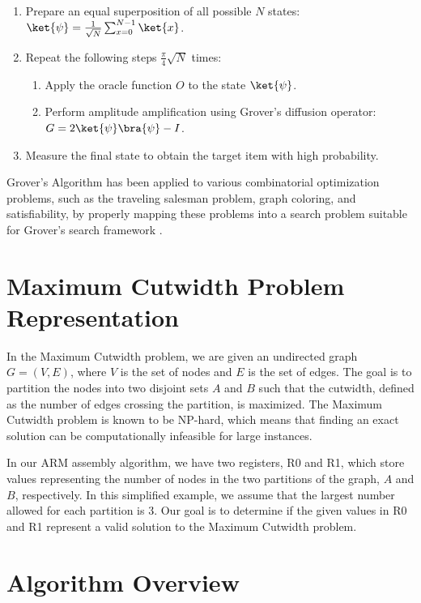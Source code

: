 \begin{enumerate}
    \item Prepare an equal superposition of all possible $N$ states: $\ket{\psi} = \frac{1}{\sqrt{N}}\sum_{x=0}^{N-1}\ket{x}$.
    
    \item Repeat the following steps $\frac{\pi}{4}\sqrt{N}$ times:
    \begin{enumerate}
        \item Apply the oracle function $O$ to the state $\ket{\psi}$.
        
        \item Perform amplitude amplification using Grover's diffusion operator: $G = 2\ket{\psi}\bra{\psi} - I$.
    \end{enumerate}
    
    \item Measure the final state to obtain the target item with high probability.
\end{enumerate}

Grover's Algorithm has been applied to various combinatorial optimization problems, such as the traveling salesman problem, graph coloring, and satisfiability, by properly mapping these problems into a search problem suitable for Grover's search framework \cite{grover_applications}.

\section{Maximum Cutwidth Problem Representation}

In the Maximum Cutwidth problem, we are given an undirected graph $G = (V, E)$, where $V$ is the set of nodes and $E$ is the set of edges. The goal is to partition the nodes into two disjoint sets $A$ and $B$ such that the cutwidth, defined as the number of edges crossing the partition, is maximized. The Maximum Cutwidth problem is known to be NP-hard, which means that finding an exact solution can be computationally infeasible for large instances.

In our ARM assembly algorithm, we have two registers, R0 and R1, which store values representing the number of nodes in the two partitions of the graph, $A$ and $B$, respectively. In this simplified example, we assume that the largest number allowed for each partition is 3. Our goal is to determine if the given values in R0 and R1 represent a valid solution to the Maximum Cutwidth problem.

\section{Algorithm Overview}

